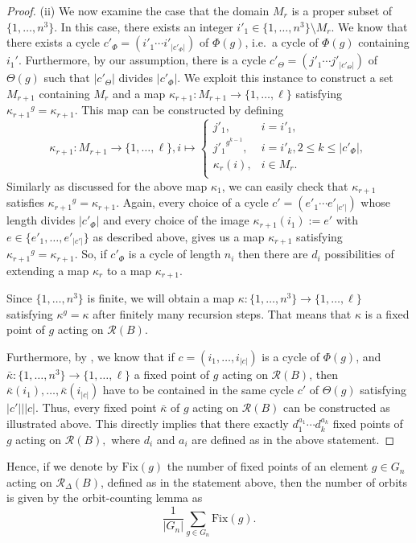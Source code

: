 \documentclass[12pt]{article}
\theoremstyle{definition}
\theoremstyle{remark}
\begin{document}
\begin{proof}
(ii) We now examine the case that the domain $M_r$ is a proper subset of $\{1,\ldots,n^3\}$. In this case, there exists an integer $i'_1\in \{1,\ldots,n^3 \}\setminus M_r.$
We know that there exists a cycle $c'_{\Phi}=(i'_1 \cdots  i'_{\vert c'_\Phi\vert })$ of $\Phi(g)$, i.e.\ a cycle of $\Phi(g)$ containing $i_1'$.
Furthermore, by our assumption, there is a cycle $c'_\Theta=(j'_1 \cdots  j'_{\vert c'_\Theta\vert })$ of $\Theta(g)$ such that $\vert c'_\Theta\vert $ divides $\vert c'_\Phi\vert.$ We exploit this instance to construct a set $M_{r+1}$ containing $M_r$ and a map $\kappa_{r+1}:M_{r+1}\to \{1,\ldots,\ell\}$ satisfying ${\kappa_{r+1}}^{g}=\kappa_{r+1}.$ This map can be constructed by defining
$$\kappa_{r+1}: M_{r+1}\to \{1,\ldots,\ell\}, i\mapsto
\begin{cases}
  j'_1, & i=i'_1,\\
  {j'_1}^{g^{k-1}}, & i=i'_k, 2\leq k \leq \vert c'_\Phi\vert, \\
 \kappa_r(i), & i \in M_r.\\
\end{cases}$$
Similarly as discussed for the above map $\kappa_1$, we can easily check that $\kappa_{r+1}$ satisfies ${\kappa_{r+1}}^{g}=\kappa_{r+1}.$ Again, every choice of a cycle $c'=(e'_1\cdots e'_{\vert c' \vert})$ whose length divides $\vert c'_\Phi\vert$ and every choice of the image $\kappa_{r+1}(i_1):=e'$ with $e\in \{e'_1,\ldots, e'_{\vert c'\vert} \}$ as described above, gives us a map $\kappa_{r+1}$ satisfying ${\kappa_{r+1}}^{g}=\kappa_{r+1}$. So, if $c'_\Phi$ is a cycle of length $n_i$ then there are $d_i$ possibilities of extending a map $\kappa_r$ to a map $\kappa_{r+1}.$

 Since $\{1,\ldots,n^3 \}$ is finite, we will obtain a map $\kappa: \{1,\ldots,n^3 \}\to \{1,\ldots,\ell\}$ satisfying $\kappa^{g}=\kappa$ after finitely many recursion steps. That means that $\kappa$ is a fixed point of $g$ acting on $\mathcal{R}(B)$.

Furthermore, by , we know that if $c=(i_1,\ldots,i_{\vert c\vert })$ is a cycle of $\Phi(g)$, and $\bar{\kappa}:\{1,\ldots,n^3 \}\to \{1,\ldots,\ell\}$ a fixed point of $g$ acting on $\mathcal{R}(B)$, then $\bar{\kappa}(i_1),\ldots,\bar{\kappa}(i_{\vert c\vert})$ have to be contained in the same cycle $c'$ of $\Theta(g)$ satisfying $\vert c' \vert \mid \vert c \vert $. Thus, every fixed point $\bar{\kappa}$ of $g$ acting on $\mathcal{R}(B)$ can be constructed as illustrated above. This directly implies that there exactly $d_1^{a_1}\cdots d_k^{a_k}$ fixed points of $g$ acting on $\mathcal{R}(B),$  where $d_i$ and $a_i$ are defined as in the above statement.
\end{proof}
Hence, if we denote by $ \mathrm{Fix}(g) $ the number of fixed points of an element $ g \in G_n $ acting on $ \mathcal{R}_\Delta(B) $, defined as in the statement above, then the number of orbits is given by the orbit-counting lemma as
\[
\frac{1}{\vert G_n\vert}\sum_{g\in G_n} \mathrm{Fix}(g).
\]
\end{document}
